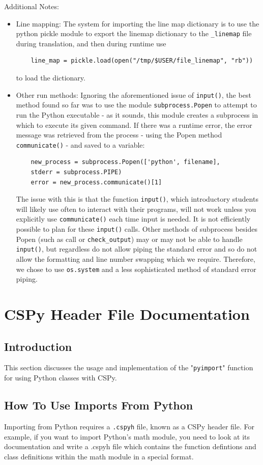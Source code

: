 \documentclass{article}
\begin{document}
Additional Notes:
\begin{itemize}
\item Line mapping: The system for importing the line map dictionary is to use the python pickle module to export the linemap dictionary to the \verb|_linemap| file during translation, and then during runtime use
\begin{verbatim}
    line_map = pickle.load(open("/tmp/$USER/file_linemap", "rb"))
\end{verbatim}
to load the dictionary.
\item Other run methods: Ignoring the aforementioned issue of \verb|input()|, the best method found so far was to use the module \verb|subprocess.Popen| to attempt to run the Python executable - as it sounds, this module creates a subprocess in which to execute its given command. If there was a runtime error, the error message was retrieved from the process - using the Popen method \verb|communicate()| - and saved to a variable:
\begin{verbatim}
    new_process = subprocess.Popen(['python', filename],
    stderr = subprocess.PIPE)
    error = new_process.communicate()[1]
\end{verbatim}
The issue with this is that the function \verb|input()|, which introductory students will likely use often to interact with their programs, will not work unless you explicitly use \verb|communicate()| each time input is needed. It is not efficiently possible to plan for these \verb|input()| calls. Other methods of subprocess besides Popen (such as call or \verb|check_output|) may or may not be able to handle \verb|input()|, but regardless do not allow piping the standard error and so do not allow the formatting and line number swapping which we require. Therefore, we chose to use \verb|os.system| and a less sophisticated method of standard error piping.
\end{itemize}
\pagebreak
\section{CSPy Header File Documentation}
\subsection{Introduction}
This section discusses the usage and implementation of the "\verb|pyimport|" function for using Python classes with CSPy.
\subsection{How To Use Imports From Python}
Importing from Python requires a \verb|.cspyh| file, known as a CSPy header file. For example, if you want to import Python's math module, you need to look at its documentation and write a .cspyh file which contains the function defintions and class definitions within the math module in a special format.
\end{document}

